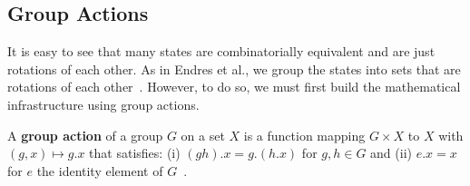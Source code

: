 



\subsection{Group Actions}

It is easy to see that many states are combinatorially equivalent and are just rotations of each other. As in Endres et al., we group the states into sets that are rotations of each other~\cite{Endres2005}. However, to do so, we must first build the mathematical infrastructure using group actions. 

\begin{mydef}%
A \textbf{group action} of a group $G$ on a set $X$ is a function mapping $G \times X$ to $X$ with $(g, x) \mapsto g.x$ that satisfies: (i) $(gh).x = g.(h.x)$ for $g,h \in G$ and (ii) $e.x = x$ for $e$ the identity element of $G$~\cite{Rotman1995}.
\end{mydef}

